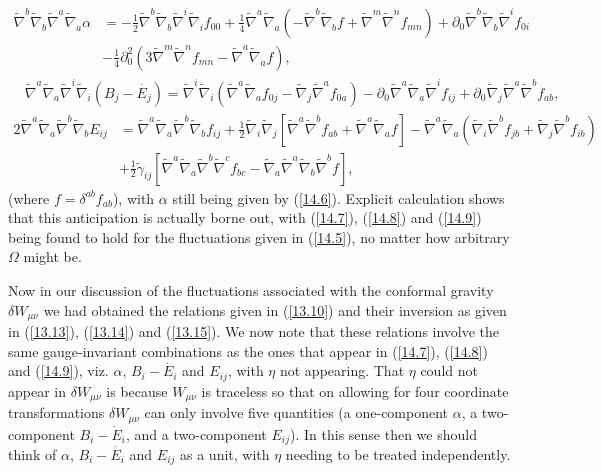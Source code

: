 \documentclass[aps,onecolumn,10pt]{revtex4}
\numberwithin{equation}{section}
\numberwithin{equation}{section}
\begin{document}
%
\begin{align}
\tilde{\nabla}^b\tilde{\nabla}_b\tilde{\nabla}^a\tilde{\nabla}_a\alpha&=-\frac{1}{2}\tilde{\nabla}^b\tilde{\nabla}_b\tilde{\nabla}^i\tilde{\nabla}_if_{00}
+\frac{1}{4}\tilde{\nabla}^a\tilde{\nabla}_a\left(-\tilde{\nabla}^b\tilde{\nabla}_bf+\tilde{\nabla}^m\tilde{\nabla}^nf_{mn}\right)
+\partial_0\tilde{\nabla}^b\tilde{\nabla}_b\tilde{\nabla}^if_{0i}
\nonumber\\
&-\frac{1}{4}\partial^2_0\left(3\tilde{\nabla}^m\tilde{\nabla}^nf_{mn}-\tilde{\nabla}^a\tilde{\nabla}_af\right),
\label{14.7}
\end{align}
%
%
\begin{align}
&\tilde{\nabla}^a\tilde{\nabla}_a\tilde{\nabla}^i\tilde{\nabla}_i(B_j-\dot{E_j})=\tilde{\nabla}^i\tilde{\nabla}_i (\tilde{\nabla}^a\tilde{\nabla}_af_{0j}-\tilde{\nabla}_j\tilde{\nabla}^af_{0a})
-\partial_0\tilde{\nabla}^a\tilde{\nabla}_a\tilde{\nabla}^if_{ij}
+\partial_0\tilde{\nabla}_j\tilde{\nabla}^a\tilde{\nabla}^bf_{ab},
\label{14.8}
\end{align}
%
%
\begin{align}
2\tilde{\nabla}^a\tilde{\nabla}_a\tilde{\nabla}^b\tilde{\nabla}_bE_{ij}
&=\tilde{\nabla}^a\tilde{\nabla}_a\tilde{\nabla}^b\tilde{\nabla}_bf_{ij}
+\tfrac{1}{2}\tilde{\nabla}_i\tilde{\nabla}_j\left[\tilde{\nabla}^a\tilde{\nabla}^bf_{ab}+\tilde{\nabla}^a\tilde{\nabla}_af\right]-\tilde{\nabla}^a\tilde{\nabla}_a(\tilde{\nabla}_i\tilde{\nabla}^bf_{jb}+\tilde{\nabla}_j\tilde{\nabla}^bf_{ib})
\nonumber\\
&+\tfrac{1}{2}\tilde{\gamma}_{ij}\left[\tilde{\nabla}^a\tilde{\nabla}_a\tilde{\nabla}^b\tilde{\nabla}^cf_{bc}
-\tilde{\nabla}_a\tilde{\nabla}^a\tilde{\nabla}_b\tilde{\nabla}^bf\right],
\label{14.9}
\end{align}
%
(where $f=\delta^{ab}f_{ab}$), with $\alpha$ still being given by (\ref{14.6}). Explicit calculation shows that this anticipation is actually borne out, with (\ref{14.7}), (\ref{14.8}) and (\ref{14.9}) being found to hold for the fluctuations given in (\ref{14.5}), no matter how arbitrary $\Omega$ might be. 

Now in our discussion of the fluctuations associated with the conformal gravity $\delta W_{\mu\nu}$ we had obtained the relations given in (\ref{13.10}) and their inversion as given in (\ref{13.13}), (\ref{13.14}) and (\ref{13.15}). We now note that these relations involve the same gauge-invariant combinations as the ones that appear in (\ref{14.7}), (\ref{14.8}) and (\ref{14.9}), viz. $\alpha$, $B_i-\dot{E_i}$ and $E_{ij}$, with $\eta$ not appearing. That $\eta$ could not appear in $\delta W_{\mu\nu}$ is because $W_{\mu\nu}$ is traceless so that on allowing for four coordinate transformations $\delta W_{\mu\nu}$ can only involve five quantities (a one-component $\alpha$, a two-component $B_i-\dot{E}_i$, and a two-component $E_{ij}$). In this sense then we should think of $\alpha$, $B_i-\dot{E_i}$ and $E_{ij}$ as a unit, with $\eta$ needing to be treated independently.
\end{document}
